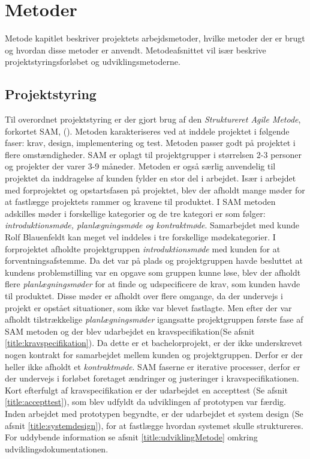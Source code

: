 \chapter{Metoder}
Metode kapitlet beskriver projektets arbejdsmetoder, hvilke metoder der er brugt og hvordan disse metoder er anvendt. Metodeafsnittet vil især beskrive projektstyringsforløbet og udviklingsmetoderne. 

\section{Projektstyring} \label{title:projektstyring}
Til overordnet projektstyring er der gjort brug af den \textit{Struktureret Agile Metode}, forkortet SAM, (\cite{RefWorks:35}). Metoden karakteriseres ved at inddele projektet i følgende faser: krav, design, implementering og test. Metoden passer godt på projektet i flere omstændigheder. SAM er oplagt til projektgrupper i størrelsen 2-3 personer og projekter der varer 3-9 måneder. Metoden er også særlig anvendelig til projektet da inddragelse af kunden fylder en stor del i arbejdet. 
Især i arbejdet med forprojektet og opstartsfasen på projektet, blev der afholdt mange møder for at fastlægge projektets rammer og kravene til produktet. I SAM metoden adskilles møder i forskellige kategorier og de tre kategori er som følger: \textit{introduktionsmøde, planlægningsmøde og kontraktmøde}. Samarbejdet med kunde Rolf Blauenfeldt kan meget vel inddeles i tre forskellige mødekategorier. I forprojektet afholdte projektgruppen \textit{introduktionsmøde} med kunden for at forventningsafstemme. Da det var på plads og projektgruppen havde besluttet at kundens problemstilling var en opgave som gruppen kunne løse, blev der afholdt flere \textit{planlægningsmøder} for at finde og udspecificere de krav, som kunden havde til produktet. Disse møder er afholdt over flere omgange, da der undervejs i projekt er opstået situationer, som ikke var blevet fastlagte. Men efter der var afholdt tilstrækkelige \textit{planlægningsmøder} igangsatte projektgruppen første fase af SAM metoden og der blev udarbejdet en kravspecifikation(Se afsnit \ref{title:kravspecifikation}). Da dette er et bachelorprojekt, er der ikke underskrevet nogen kontrakt for samarbejdet mellem kunden og projektgruppen. Derfor er der heller ikke afholdt et \textit{kontraktmøde}. SAM faserne er iterative processer, derfor er der undervejs i forløbet  foretaget ændringer og justeringer i kravspecifikationen. Kort efterfulgt af kravspecifikation er der udarbejdet en accepttest (Se afsnit \ref{title:accepttest}), som blev udfyldt da udviklingen af prototypen var færdig. Inden arbejdet med prototypen begyndte, er der udarbejdet et system design (Se afsnit \ref{title:systemdesign}), for at fastlægge hvordan systemet skulle struktureres. For uddybende information se afsnit \ref{title:udviklingMetode} omkring udviklingsdokumentationen.

